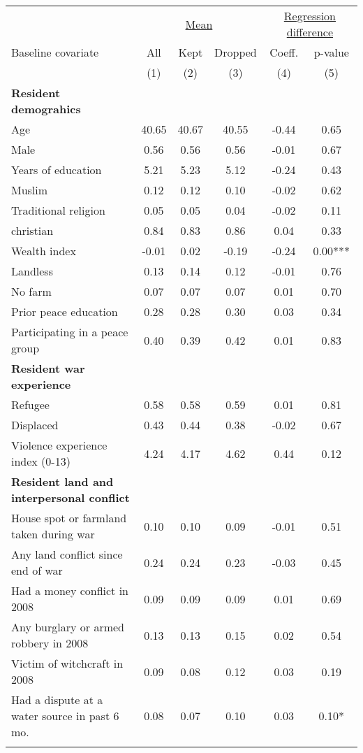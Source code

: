 \begin{tabular}{lccccc}
\hline \noalign{\smallskip} & \multicolumn{3}{c}{\uline{\hfill Mean \hfill}} & \multicolumn{2}{c}{\uline{\hfill Regression difference \hfill}}\\
Baseline covariate & All & Kept & Dropped & Coeff. & p-value\\
 & (1) & (2) & (3) & (4) & (5)\\
\noalign{\smallskip}\hline \noalign{\smallskip}\textbf{Resident demograhics} &  &  &  &  & \\
Age & 40.65 & 40.67 & 40.55 & -0.44 & 0.65\\
Male & 0.56 & 0.56 & 0.56 & -0.01 & 0.67\\
Years of education & 5.21 & 5.23 & 5.12 & -0.24 & 0.43\\
Muslim & 0.12 & 0.12 & 0.10 & -0.02 & 0.62\\
Traditional religion & 0.05 & 0.05 & 0.04 & -0.02 & 0.11\\
christian & 0.84 & 0.83 & 0.86 & 0.04 & 0.33\\
Wealth index & -0.01 & 0.02 & -0.19 & -0.24 & 0.00***\\
Landless & 0.13 & 0.14 & 0.12 & -0.01 & 0.76\\
No farm & 0.07 & 0.07 & 0.07 & 0.01 & 0.70\\
Prior peace education & 0.28 & 0.28 & 0.30 & 0.03 & 0.34\\
Participating in a peace group & 0.40 & 0.39 & 0.42 & 0.01 & 0.83\\
\textbf{Resident war experience} &  &  &  &  & \\
Refugee & 0.58 & 0.58 & 0.59 & 0.01 & 0.81\\
Displaced & 0.43 & 0.44 & 0.38 & -0.02 & 0.67\\
Violence experience index (0-13) & 4.24 & 4.17 & 4.62 & 0.44 & 0.12\\
\textbf{Resident land and interpersonal conflict} &  &  &  &  & \\
House spot or farmland taken during war & 0.10 & 0.10 & 0.09 & -0.01 & 0.51\\
Any land conflict since end of war & 0.24 & 0.24 & 0.23 & -0.03 & 0.45\\
Had a money conflict in 2008 & 0.09 & 0.09 & 0.09 & 0.01 & 0.69\\
Any burglary or armed robbery in 2008 & 0.13 & 0.13 & 0.15 & 0.02 & 0.54\\
Victim of witchcraft in 2008 & 0.09 & 0.08 & 0.12 & 0.03 & 0.19\\
Had a dispute at a water source in past 6 mo. & 0.08 & 0.07 & 0.10 & 0.03 & 0.10*\\
\noalign{\smallskip}\hline\end{tabular}
